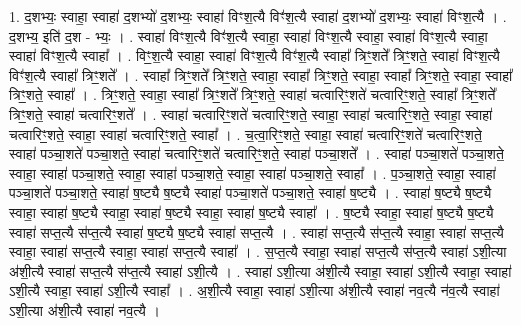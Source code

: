 \documentclass[17pt]{extarticle}
\begin{document}
1. द॒शभ्यः॒ स्वाहा॒ स्वाहा॑ द॒शभ्यो॑ द॒शभ्यः॒ स्वाहा॑ विꣳश॒त्यै विꣳ॑श॒त्यै स्वाहा॑ द॒शभ्यो॑ द॒शभ्यः॒ स्वाहा॑ विꣳश॒त्यै । . द॒शभ्य॒ इति॑ द॒श - भ्यः॒ । . स्वाहा॑ विꣳश॒त्यै विꣳ॑श॒त्यै स्वाहा॒ स्वाहा॑ विꣳश॒त्यै स्वाहा॒ स्वाहा॑ विꣳश॒त्यै स्वाहा॒ स्वाहा॑ विꣳश॒त्यै स्वाहा᳚ । . विꣳ॒॒श॒त्यै स्वाहा॒ स्वाहा॑ विꣳश॒त्यै विꣳ॑श॒त्यै स्वाहा᳚ त्रिꣳ॒॒शते᳚ त्रिꣳ॒॒शते॒ स्वाहा॑ विꣳश॒त्यै विꣳ॑श॒त्यै स्वाहा᳚ त्रिꣳ॒॒शते᳚ । . स्वाहा᳚ त्रिꣳ॒॒शते᳚ त्रिꣳ॒॒शते॒ स्वाहा॒ स्वाहा᳚ त्रिꣳ॒॒शते॒ स्वाहा॒ स्वाहा᳚ त्रिꣳ॒॒शते॒ स्वाहा॒ स्वाहा᳚ त्रिꣳ॒॒शते॒ स्वाहा᳚ । . त्रिꣳ॒॒शते॒ स्वाहा॒ स्वाहा᳚ त्रिꣳ॒॒शते᳚ त्रिꣳ॒॒शते॒ स्वाहा॑ चत्वारिꣳ॒॒शते॑ चत्वारिꣳ॒॒शते॒ स्वाहा᳚ त्रिꣳ॒॒शते᳚ त्रिꣳ॒॒शते॒ स्वाहा॑ चत्वारिꣳ॒॒शते᳚ । . स्वाहा॑ चत्वारिꣳ॒॒शते॑ चत्वारिꣳ॒॒शते॒ स्वाहा॒ स्वाहा॑ चत्वारिꣳ॒॒शते॒ स्वाहा॒ स्वाहा॑ चत्वारिꣳ॒॒शते॒ स्वाहा॒ स्वाहा॑ चत्वारिꣳ॒॒शते॒ स्वाहा᳚ । . च॒त्वा॒रिꣳ॒॒शते॒ स्वाहा॒ स्वाहा॑ चत्वारिꣳ॒॒शते॑ चत्वारिꣳ॒॒शते॒ स्वाहा॑ पञ्चा॒शते॑ पञ्चा॒शते॒ स्वाहा॑ चत्वारिꣳ॒॒शते॑ चत्वारिꣳ॒॒शते॒ स्वाहा॑ पञ्चा॒शते᳚ । . स्वाहा॑ पञ्चा॒शते॑ पञ्चा॒शते॒ स्वाहा॒ स्वाहा॑ पञ्चा॒शते॒ स्वाहा॒ स्वाहा॑ पञ्चा॒शते॒ स्वाहा॒ स्वाहा॑ पञ्चा॒शते॒ स्वाहा᳚ । . प॒ञ्चा॒शते॒ स्वाहा॒ स्वाहा॑ पञ्चा॒शते॑ पञ्चा॒शते॒ स्वाहा॑ ष॒ष्ट्यै ष॒ष्ट्यै स्वाहा॑ पञ्चा॒शते॑ पञ्चा॒शते॒ स्वाहा॑ ष॒ष्ट्यै । . स्वाहा॑ ष॒ष्ट्यै ष॒ष्ट्यै स्वाहा॒ स्वाहा॑ ष॒ष्ट्यै स्वाहा॒ स्वाहा॑ ष॒ष्ट्यै स्वाहा॒ स्वाहा॑ ष॒ष्ट्यै स्वाहा᳚ । . ष॒ष्ट्यै स्वाहा॒ स्वाहा॑ ष॒ष्ट्यै ष॒ष्ट्यै स्वाहा॑ सप्त॒त्यै स॑प्त॒त्यै स्वाहा॑ ष॒ष्ट्यै ष॒ष्ट्यै स्वाहा॑ सप्त॒त्यै । . स्वाहा॑ सप्त॒त्यै स॑प्त॒त्यै स्वाहा॒ स्वाहा॑ सप्त॒त्यै स्वाहा॒ स्वाहा॑ सप्त॒त्यै स्वाहा॒ स्वाहा॑ सप्त॒त्यै स्वाहा᳚ । . स॒प्त॒त्यै स्वाहा॒ स्वाहा॑ सप्त॒त्यै स॑प्त॒त्यै स्वाहा॑ ऽशी॒त्या अ॑शी॒त्यै स्वाहा॑ सप्त॒त्यै स॑प्त॒त्यै स्वाहा॑ ऽशी॒त्यै । . स्वाहा॑ ऽशी॒त्या अ॑शी॒त्यै स्वाहा॒ स्वाहा॑ ऽशी॒त्यै स्वाहा॒ स्वाहा॑ ऽशी॒त्यै स्वाहा॒ स्वाहा॑ ऽशी॒त्यै स्वाहा᳚ । . अ॒शी॒त्यै स्वाहा॒ स्वाहा॑ ऽशी॒त्या अ॑शी॒त्यै स्वाहा॑ नव॒त्यै न॑व॒त्यै स्वाहा॑ ऽशी॒त्या अ॑शी॒त्यै स्वाहा॑ नव॒त्यै । \newline
\end{document}
